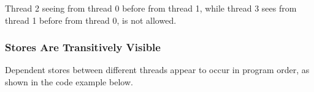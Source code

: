 \begin{table}[!hbt]
\noindent{}
\caption[Stores Are Seen in a Consistent Order by Other Threads]{Stores Are Seen in a Consistent Order by Other Threads \cite[Example 6]{ref:AMD}}
\label{tbl:litmus:amd:6}
\end{table}

\noindent
Thread 2 seeing  from thread 0 before  from thread 1, while thread 3 sees  from thread 1 before  from thread 0, is not allowed.

\subsubsection*{Stores Are Transitively Visible}

Dependent stores between different threads appear to occur in program order, as shown in the code example below.

